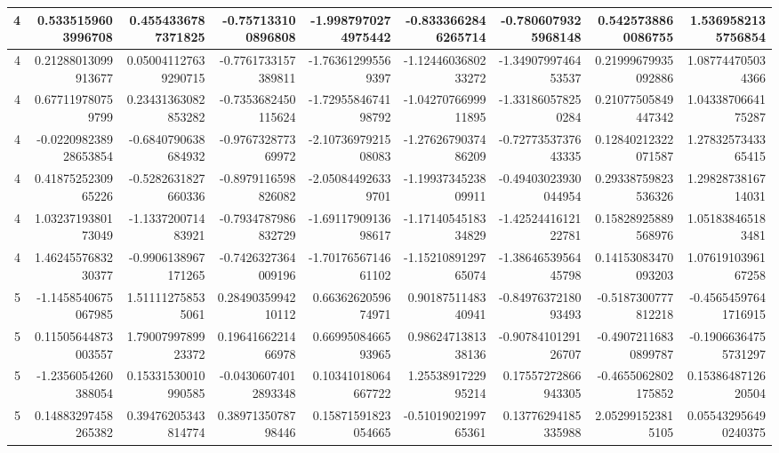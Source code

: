 \documentclass{jlreq}
\numberwithin{equation}{section}
\begin{document}
\begin{table}[H]
{\begin{tabular}{|r|r|r|r|r|r|r|r|r|}
      4 & 0.5335159603996708    & 0.4554336787371825    & -0.757133100896808   & -1.9987970274975442  & -0.8333662846265714   & -0.7806079325968148   & 0.5425738860086755    & 1.5369582135756854    \\ \hline
      4 & 0.21288013099913677   & 0.050041127639290715  & -0.7761733157389811  & -1.763612995569397   & -1.1244603680233272   & -1.3490799746453537   & 0.21999679935092886   & 1.087744705034366     \\ \hline
      4 & 0.677119780759799     & 0.23431363082853282   & -0.7353682450115624  & -1.7295584674198792  & -1.0427076699911895   & -1.331860578250284    & 0.21077505849447342   & 1.0433870664175287    \\ \hline
      4 & -0.022098238928653854 & -0.6840790638684932   & -0.976732877369972   & -2.1073697921508083  & -1.2762679037486209   & -0.7277353737643335   & 0.12840212322071587   & 1.2783257343365415    \\ \hline
      4 & 0.4187525230965226    & -0.5282631827660336   & -0.8979116598826082  & -2.050844926339701   & -1.1993734523809911   & -0.49403023930044954  & 0.29338759823536326   & 1.2982873816714031    \\ \hline
      4 & 1.0323719380173049    & -1.133720071483921    & -0.7934787986832729  & -1.6911790913698617  & -1.1714054518334829   & -1.4252441612122781   & 0.15828925889568976   & 1.051838465183481     \\ \hline
      4 & 1.4624557683230377    & -0.9906138967171265   & -0.7426327364009196  & -1.7017656714661102  & -1.1521089129765074   & -1.3864653956445798   & 0.14153083470093203   & 1.0761910396167258    \\ \hline
      5 & -1.1458540675067985   & 1.511112758535061     & 0.2849035994210112   & 0.6636262059674971   & 0.9018751148340941    & -0.8497637218093493   & -0.5187300777812218   & -0.45654597641716915  \\ \hline
      5 & 0.11505644873003557   & 1.7900799789923372    & 0.1964166221466978   & 0.6699508466593965   & 0.9862471381338136    & -0.9078410129126707   & -0.49072116830899787  & -0.19066364755731297  \\ \hline
      5 & -1.2356054260388054   & 0.15331530010990585   & -0.04306074012893348 & 0.10341018064667722  & 1.2553891722995214    & 0.17557272866943305   & -0.4655062802175852   & 0.1538648712620504    \\ \hline
      5 & 0.14883297458265382   & 0.39476205343814774   & 0.3897135078798446   & 0.15871591823054665  & -0.5101902199765361   & 0.13776294185335988   & 2.052991523815105     & 0.055432956490240375  \\ \hline

\end{tabular}}
\end{table}
\end{document}
